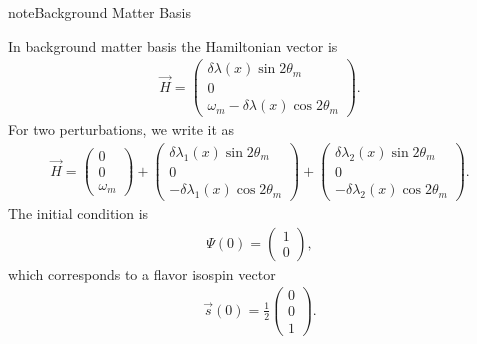 \documentclass[letterpaper,12pt,english]{sphinxmanual}
\begin{document}
\begin{sphinxadmonition}{note}{Background Matter Basis}

In background matter basis the Hamiltonian vector is
\begin{equation*}
\begin{split}\vec H = \begin{pmatrix}
\delta \lambda(x) \sin 2\theta_m \\
0 \\
\omega_m - \delta \lambda(x) \cos 2\theta_m
\end{pmatrix}.\end{split}
\end{equation*}
For two perturbations, we write it as
\begin{equation*}
\begin{split}\vec H = \begin{pmatrix}
0 \\
0 \\
\omega_m
\end{pmatrix} + \begin{pmatrix}
\delta \lambda_1(x) \sin 2\theta_m \\
0 \\
 - \delta \lambda_1(x) \cos 2\theta_m
\end{pmatrix} + \begin{pmatrix}
\delta \lambda_2(x) \sin 2\theta_m \\
0 \\
 - \delta \lambda_2(x) \cos 2\theta_m
\end{pmatrix}.\end{split}
\end{equation*}
The initial condition is
\begin{equation*}
\begin{split}\Psi(0) = \begin{pmatrix}
1 \\
0
\end{pmatrix},\end{split}
\end{equation*}
which corresponds to a flavor isospin vector
\begin{equation*}
\begin{split}\vec s(0) = \frac{1}{2} \begin{pmatrix}
0 \\
0 \\
1
\end{pmatrix}.\end{split}
\end{equation*}\end{sphinxadmonition}
\end{document}
